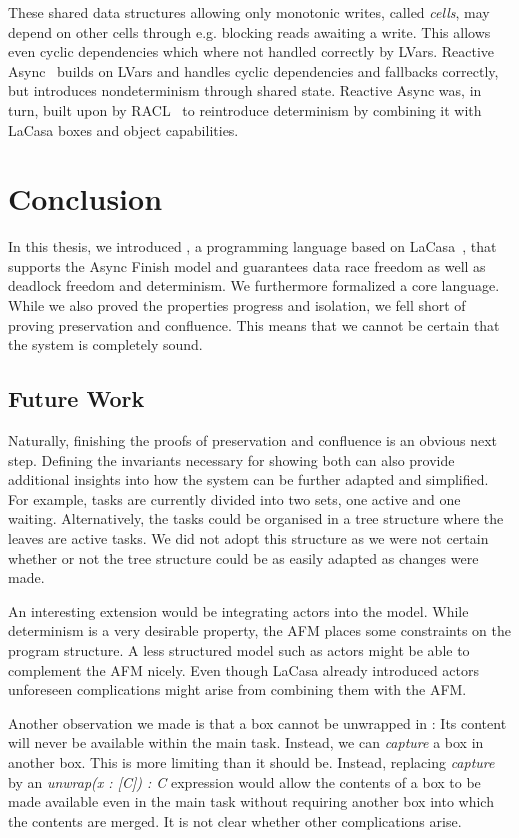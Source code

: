These shared data structures allowing only monotonic writes, called \textit{cells}, may depend on other cells through e.g. blocking reads awaiting a write. This allows even cyclic dependencies which where not handled correctly by LVars. Reactive Async~\cite{haller_reactive_2016} builds on LVars and handles cyclic dependencies and fallbacks correctly, but introduces nondeterminism through shared state. Reactive Async was, in turn, built upon by RACL~\cite{arvidsson_deterministic_2018} to reintroduce determinism by combining it with LaCasa boxes and object capabilities.


\chapter{Conclusion}\label{concl}
In this thesis, we introduced \plc, a programming language based on LaCasa~\cite{haller_lacasa_2016}, that supports the Async Finish model and guarantees data race freedom as well as deadlock freedom and determinism. We furthermore formalized a core language. While we also proved the properties progress and isolation, we fell short of proving preservation and confluence. This means that we cannot be certain that the system is completely sound.

\section{Future Work}
Naturally, finishing the proofs of preservation and confluence is an obvious next step. Defining the invariants necessary for showing both can also provide additional insights into how the system can be further adapted and simplified. For example, tasks are currently divided into two sets, one active and one waiting. Alternatively, the tasks could be organised in a tree structure where the leaves are active tasks. We did not adopt this structure as we were not certain whether or not the tree structure could be as easily adapted as changes were made.

An interesting extension would be integrating actors into the model. While determinism is a very desirable property, the AFM places some constraints on the program structure. A less structured model such as actors might be able to complement the AFM nicely. Even though LaCasa already introduced actors unforeseen complications might arise from combining them with the AFM.

Another observation we made is that a box cannot be unwrapped in \plc: Its content will never be available within the main task. Instead, we can \textit{capture} a box in another box. This is more limiting than it should be. Instead, replacing \textit{capture} by an \textit{unwrap(x : [C]) : C} expression would allow the contents of a box to be made available even in the main task without requiring another box into which the contents are merged. It is not clear whether other complications arise.

